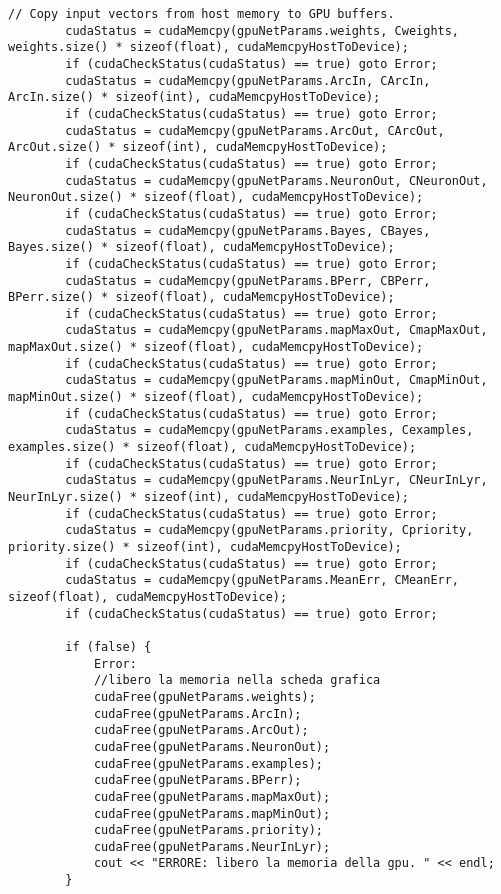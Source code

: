 \documentclass[10pt,a4paper]{article}
\begin{document}
\begin{lstlisting}[style=mycuda, caption=librerie usate, captionpos=b]
		// Copy input vectors from host memory to GPU buffers.
		cudaStatus = cudaMemcpy(gpuNetParams.weights, Cweights, weights.size() * sizeof(float), cudaMemcpyHostToDevice);
		if (cudaCheckStatus(cudaStatus) == true) goto Error;
		cudaStatus = cudaMemcpy(gpuNetParams.ArcIn, CArcIn, ArcIn.size() * sizeof(int), cudaMemcpyHostToDevice);
		if (cudaCheckStatus(cudaStatus) == true) goto Error;
		cudaStatus = cudaMemcpy(gpuNetParams.ArcOut, CArcOut, ArcOut.size() * sizeof(int), cudaMemcpyHostToDevice);
		if (cudaCheckStatus(cudaStatus) == true) goto Error;
		cudaStatus = cudaMemcpy(gpuNetParams.NeuronOut, CNeuronOut, NeuronOut.size() * sizeof(float), cudaMemcpyHostToDevice);
		if (cudaCheckStatus(cudaStatus) == true) goto Error;
		cudaStatus = cudaMemcpy(gpuNetParams.Bayes, CBayes, Bayes.size() * sizeof(float), cudaMemcpyHostToDevice);
		if (cudaCheckStatus(cudaStatus) == true) goto Error;
		cudaStatus = cudaMemcpy(gpuNetParams.BPerr, CBPerr, BPerr.size() * sizeof(float), cudaMemcpyHostToDevice);
		if (cudaCheckStatus(cudaStatus) == true) goto Error;
		cudaStatus = cudaMemcpy(gpuNetParams.mapMaxOut, CmapMaxOut, mapMaxOut.size() * sizeof(float), cudaMemcpyHostToDevice);
		if (cudaCheckStatus(cudaStatus) == true) goto Error;
		cudaStatus = cudaMemcpy(gpuNetParams.mapMinOut, CmapMinOut, mapMinOut.size() * sizeof(float), cudaMemcpyHostToDevice);
		if (cudaCheckStatus(cudaStatus) == true) goto Error;
		cudaStatus = cudaMemcpy(gpuNetParams.examples, Cexamples, examples.size() * sizeof(float), cudaMemcpyHostToDevice);
		if (cudaCheckStatus(cudaStatus) == true) goto Error;
		cudaStatus = cudaMemcpy(gpuNetParams.NeurInLyr, CNeurInLyr, NeurInLyr.size() * sizeof(int), cudaMemcpyHostToDevice);
		if (cudaCheckStatus(cudaStatus) == true) goto Error;
		cudaStatus = cudaMemcpy(gpuNetParams.priority, Cpriority, priority.size() * sizeof(int), cudaMemcpyHostToDevice);
		if (cudaCheckStatus(cudaStatus) == true) goto Error;
		cudaStatus = cudaMemcpy(gpuNetParams.MeanErr, CMeanErr, sizeof(float), cudaMemcpyHostToDevice);
		if (cudaCheckStatus(cudaStatus) == true) goto Error;

		if (false) {
			Error:
			//libero la memoria nella scheda grafica
			cudaFree(gpuNetParams.weights);
			cudaFree(gpuNetParams.ArcIn);
			cudaFree(gpuNetParams.ArcOut);
			cudaFree(gpuNetParams.NeuronOut);
			cudaFree(gpuNetParams.examples);
			cudaFree(gpuNetParams.BPerr);
			cudaFree(gpuNetParams.mapMaxOut);
			cudaFree(gpuNetParams.mapMinOut);
			cudaFree(gpuNetParams.priority);
			cudaFree(gpuNetParams.NeurInLyr);
			cout << "ERRORE: libero la memoria della gpu. " << endl;
		}
			

\end{lstlisting}
\end{document}
